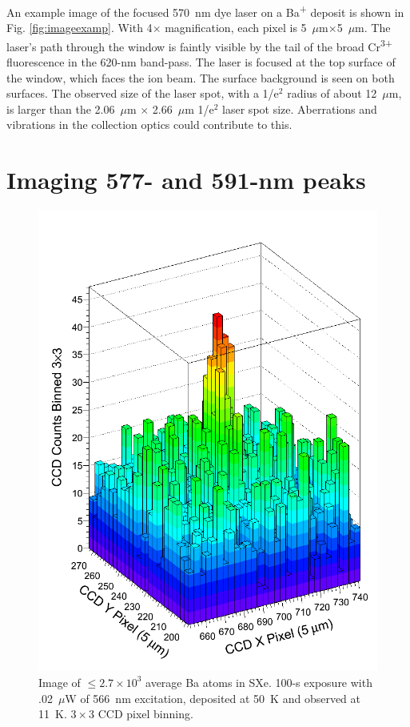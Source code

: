 An example image of the focused 570~nm dye laser on a Ba\textsuperscript{+} deposit is shown in Fig. \ref{fig:imageexamp}.  With 4$\times$ magnification, each pixel is 5~$\mu$m$\times$5~$\mu$m.  The laser's path through the window is faintly visible by the tail of the broad Cr\textsuperscript{3+} fluorescence in the 620-nm band-pass.  The laser is focused at the top surface of the window, which faces the ion beam.  The surface background is seen on both surfaces.  The observed size of the laser spot, with a 1/e$^{2}$ radius of about 12~$\mu$m, is larger than the 2.06~$\mu$m $\times$ 2.66~$\mu$m 1/e$^{2}$ laser spot size.  Aberrations and vibrations in the collection optics could contribute to this.


\section{Imaging 577- and 591-nm peaks}
\label{sec:imaging590and577}

\begin{figure} %
        \centering
                \includegraphics[width=.6\textwidth]{figures/image_1e4.png}
                \caption{Image of $\leq 2.7 \times 10^{3}$ average Ba atoms in SXe.  100-s exposure with .02~$\mu$W of 566~nm excitation, deposited at 50~K and observed at 11~K.  $3 \times 3$ CCD pixel binning.}
\label{fig:image590s}
\end{figure}


